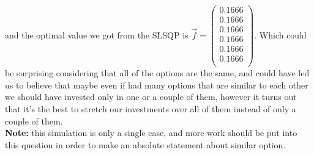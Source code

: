 \documentclass{article}
\begin{document}
	and the optimal value we got from the SLSQP is 
	\begin{math}
		\overrightarrow{f} = 
		\begin{pmatrix}
			0.1666 \\
			0.1666 \\
			0.1666 \\
			0.1666 \\
			0.1666 \\
			0.1666 \\
		\end{pmatrix}
	\end{math}.
	\newline\newline
	Which could be surprising considering that all of the options are the same, and could have led us to believe that maybe even if had many options that are similar to each other we should have invested only in one or a couple of them, however it turns out that it's the best to stretch our investments over all of them instead of only a couple of them.\\
	\textbf{Note:} this simulation is only a single case, and more work should be put into this question in order to make an absolute statement about similar option.
\end{document}
